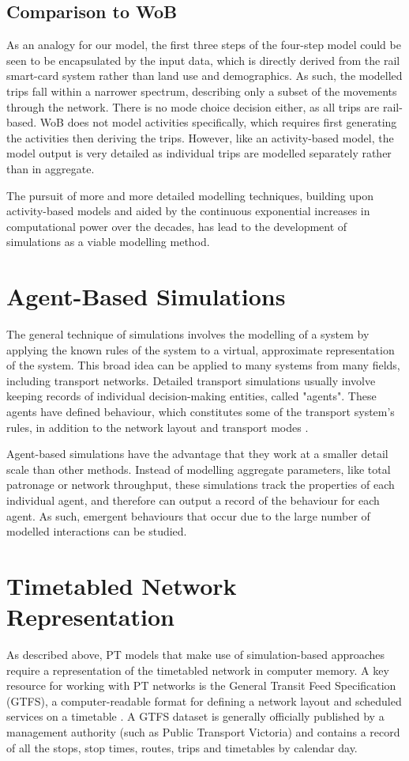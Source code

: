 \subsection{Comparison to WoB}
As an analogy for our model, the first three steps of the four-step model could be seen to be encapsulated by the input data, which is directly derived from the rail smart-card system rather than land use and demographics. As such, the modelled trips fall within a narrower spectrum, describing only a subset of the movements through the network. There is no mode choice decision either, as all trips are rail-based. WoB does not model activities specifically, which requires first generating the activities then deriving the trips. However, like an activity-based model, the model output is very detailed as individual trips are modelled separately rather than in aggregate.

The pursuit of more and more detailed modelling techniques, building upon activity-based models and aided by the continuous exponential increases in computational power over the decades, has lead to the development of simulations as a viable modelling method.

\section{Agent-Based Simulations}
\label{sec:Simulations}
The general technique of simulations involves the modelling of a system by applying the known rules of the system to a virtual, approximate representation of the system. This broad idea can be applied to many systems from many fields, including transport networks. Detailed transport simulations usually involve keeping records of individual decision-making entities, called "agents". These agents have defined behaviour, which constitutes some of the transport system's rules, in addition to the network layout and transport modes \cite{horniMultiAgentTransportSimulation2016}.

Agent-based simulations have the advantage that they work at a smaller detail scale than other methods. Instead of modelling aggregate parameters, like total patronage or network throughput, these simulations track the properties of each individual agent, and therefore can output a record of the behaviour for each agent. As such, emergent behaviours that occur due to the large number of modelled interactions can be studied.

\section{Timetabled Network Representation}
\label{sec: GTFS}
As described above, PT models that make use of simulation-based approaches require a representation of the timetabled network in computer memory. A key resource for working with PT networks is the General Transit Feed Specification (GTFS), a computer-readable format for defining a network layout and scheduled services on a timetable \cite{mobilitydataReferenceGeneralTransit2024}. A GTFS dataset is generally officially published by a management authority (such as Public Transport Victoria) and contains a record of all the stops, stop times, routes, trips and timetables by calendar day. 

